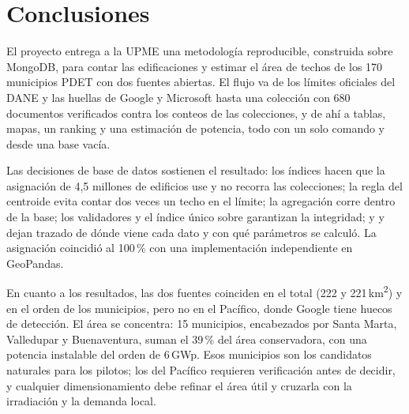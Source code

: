 \section{Conclusiones}
\label{sec:conclusiones}

El proyecto entrega a la UPME una metodología reproducible, construida sobre
MongoDB, para contar las edificaciones y estimar el área de techos de los 170
municipios PDET con dos fuentes abiertas. El flujo va de los límites oficiales
del DANE y las huellas de Google y Microsoft hasta una colección
 con 680 documentos verificados contra los conteos de las
colecciones, y de ahí a tablas, mapas, un ranking y una estimación de potencia,
todo con un solo comando y desde una base vacía.

Las decisiones de base de datos sostienen el resultado: los índices
 hacen que la asignación de 4,5 millones de edificios use
 y no recorra las colecciones; la regla del centroide evita
contar dos veces un techo en el límite; la agregación corre dentro de la base;
los validadores  y el índice único sobre 
garantizan la integridad; y  y  dejan
trazado de dónde viene cada dato y con qué parámetros se calculó. La asignación
coincidió al 100\,\% con una implementación independiente en GeoPandas.

En cuanto a los resultados, las dos fuentes coinciden en el total (222 y
221\,km\textsuperscript{2}) y en el orden de los municipios, pero no en el
Pacífico, donde Google tiene huecos de detección. El área se concentra: 15
municipios, encabezados por Santa Marta, Valledupar y Buenaventura, suman el
39\,\% del área conservadora, con una potencia instalable del orden de
6\,GWp. Esos municipios son los candidatos naturales para los pilotos; los del
Pacífico requieren verificación antes de decidir, y cualquier dimensionamiento
debe refinar el área útil y cruzarla con la irradiación y la demanda local.

